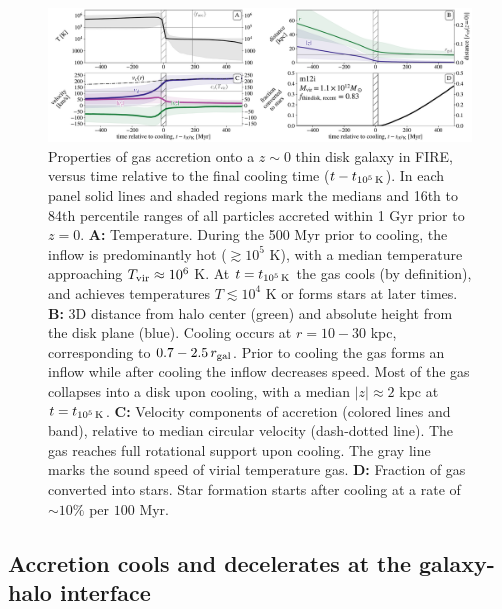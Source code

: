 \documentclass[fleqn,usenatbib]{mnras}
\newcommand{\tcools}{t_{10^5\,{\rm K}}}
\newcommand{\Tvir}{T_{\rm vir}}
\begin{document}
\begin{figure}
\includegraphics[width=\textwidth]{figures/before_and_after/before_and_after_characteristics_m12i_md.pdf}
\caption{
Properties of gas accretion onto a $z\sim0$ thin disk galaxy in FIRE, versus time relative to the final cooling time ($t - \tcools$).
In each panel solid lines and shaded regions mark the medians and 16th to 84th percentile ranges of all particles accreted within 1 Gyr prior to $z=0$. 
\textbf{A:}
Temperature.
During the 500 Myr prior to cooling, the inflow is predominantly hot ($\gtrsim 10^5$ K), with a median temperature approaching $\Tvir\approx10^6$ K.
At $t = \tcools$ the gas cools (by definition), and achieves  temperatures $T\lesssim10^4$ K or forms stars at later times.
\textbf{B:}
3D distance from halo center (green) and absolute height from the disk plane (blue).
Cooling occurs at $r=10-30$ kpc, corresponding to $0.7-2.5\,r_{\rm gal}$.
Prior to cooling the gas forms an inflow while after cooling the inflow decreases speed.
Most of the gas collapses into a disk upon cooling, with a median $\vert z \vert \approx 2$ kpc at $t=\tcools$.
\textbf{C:}
Velocity components of accretion (colored lines and band), relative to median circular velocity (dash-dotted line).
The gas reaches full rotational support upon cooling.
The gray line marks the sound speed of virial temperature gas.
\textbf{D:}
Fraction of gas converted into stars.
Star formation starts after cooling %
at a rate of $\sim10\%$ per $100$ Myr.
}
\label{f: before and after A}
\end{figure}


\subsection{Accretion cools and decelerates at the galaxy-halo interface}
\label{s: characteristics -- cools}
\end{document}
